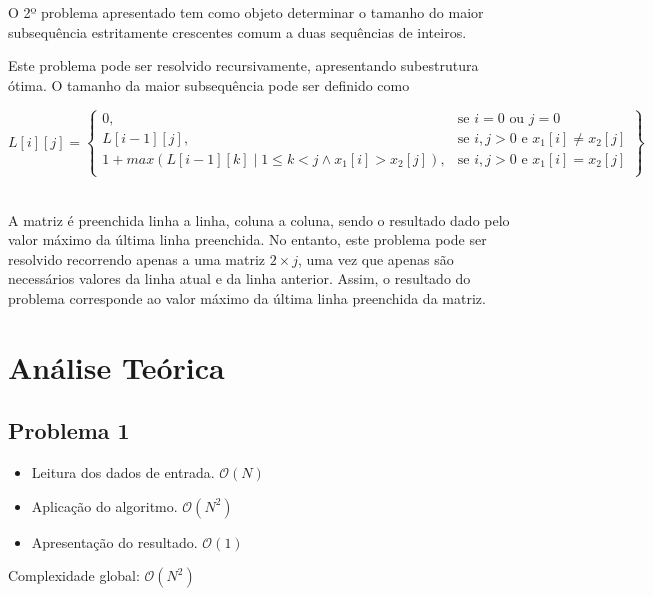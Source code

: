 \documentclass[12pt, letterpaper]{article}
\begin{document}
O 2º problema apresentado tem como objeto determinar o tamanho do maior subsequência
estritamente crescentes comum a duas sequências de inteiros.

Este problema pode ser resolvido recursivamente, apresentando subestrutura ótima.
O tamanho da maior subsequência pode ser definido como

\begin{center}
	\[
	L[i][j] = \left\{\begin{array}{lr}
		0, & \text{se } i = 0 \text{ ou } j = 0\\
		L[i-1][j], & \text{se } i,j > 0 \text{ e } x_1[i] \neq x_2[j]\\
		1 +	max(L[i-1][k] \mid 1 \leq k < j \land x_1[i] > x_2[j]), & \text{se } i,j > 0 \text{ e } x_1[i] = x_2[j]\\
        \end{array}\right\}
	\]\\[\baselineskip]
\end{center}

A matriz é preenchida linha a linha, coluna a coluna, sendo o resultado dado
pelo valor máximo da última linha preenchida.
No entanto, este problema pode ser resolvido recorrendo apenas a uma matriz $2
\times j$, uma vez que apenas são necessários valores da linha atual e da linha
anterior. Assim, o resultado do problema corresponde ao valor máximo da última
linha preenchida da matriz.


\pagebreak
\section{Análise Teórica}

\subsection{Problema 1}
\begin{itemize}
	\item Leitura dos dados de entrada. $\mathcal{O}(N)$
	\item Aplicação do algoritmo. $\mathcal{O}(N^2)$
	\item Apresentação do resultado. $\mathcal{O}(1)$
\end{itemize}
Complexidade global: $\mathcal{O}(N^2)$
\end{document}
